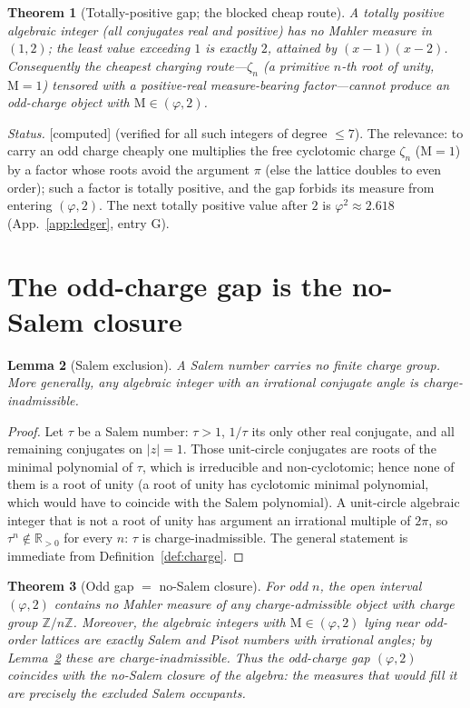 \documentclass[11pt]{article}
\newtheorem{theorem}{Theorem}[section]
\newtheorem{lemma}[theorem]{Lemma}
\theoremstyle{definition}
\theoremstyle{remark}
\newcommand{\Mah}{\mathrm{M}}
\newcommand{\Z}{\mathbb{Z}}
\newcommand{\R}{\mathbb{R}}
\newcommand{\gold}{\varphi}
\newcommand{\Zmod}[1]{\Z/#1\Z}
\newcommand{\status}[1]{{\small\textsf{[#1]}}}
\newcommand{\computed}{\status{computed}}
\begin{document}
\begin{theorem}[Totally-positive gap; the blocked cheap route]\label{thm:tp}
A totally positive algebraic integer (all conjugates real and positive) has no Mahler measure
in $(1,2)$; the least value exceeding $1$ is exactly $2$, attained by $(x-1)(x-2)$.
Consequently the cheapest charging route---$\zeta_n$ (a primitive $n$-th root of unity,
$\Mah=1$) tensored with a positive-real measure-bearing factor---cannot produce an odd-charge
object with $\Mah\in(\gold,2)$.
\end{theorem}
\emph{Status.} \computed{} (verified for all such integers of degree $\le7$). The relevance:
to carry an odd charge cheaply one multiplies the free cyclotomic charge $\zeta_n$
($\Mah=1$) by a factor whose roots avoid the argument $\pi$ (else the lattice doubles to even
order); such a factor is totally positive, and the gap forbids its measure from entering
$(\gold,2)$. The next totally positive value after $2$ is $\gold^{2}\approx2.618$
(App.~\ref{app:ledger}, entry G).

\section{The odd-charge gap is the no-Salem closure}\label{sec:salem}

\begin{lemma}[Salem exclusion]\label{lem:salem}
A Salem number carries no finite charge group. More generally, any algebraic integer with an
irrational conjugate angle is charge-inadmissible.
\end{lemma}
\begin{proof}
Let $\tau$ be a Salem number: $\tau>1$, $1/\tau$ its only other real conjugate, and all
remaining conjugates on $|z|=1$. Those unit-circle conjugates are roots of the minimal
polynomial of $\tau$, which is irreducible and non-cyclotomic; hence none of them is a root
of unity (a root of unity has cyclotomic minimal polynomial, which would have to coincide
with the Salem polynomial). A unit-circle algebraic integer that is not a root of unity has
argument an irrational multiple of $2\pi$, so $\tau^{n}\notin\R_{>0}$ for every $n$:
$\tau$ is charge-inadmissible. The general statement is immediate from
Definition~\ref{def:charge}.
\end{proof}

\begin{theorem}[Odd gap $=$ no-Salem closure]\label{thm:salemgap}
For odd $n$, the open interval $(\gold,2)$ contains no Mahler measure of any
charge-admissible object with charge group $\Zmod n$. Moreover, the algebraic integers with
$\Mah\in(\gold,2)$ lying near odd-order lattices are exactly Salem and Pisot numbers with
irrational angles; by Lemma~\ref{lem:salem} these are charge-inadmissible. Thus the
odd-charge gap $(\gold,2)$ coincides with the no-Salem closure of the algebra: the measures
that would fill it are precisely the excluded Salem occupants.
\end{theorem}
\end{document}
